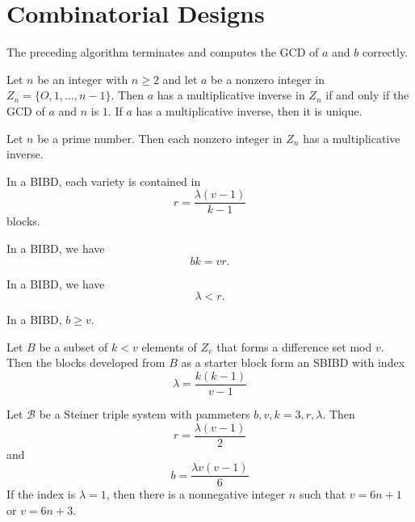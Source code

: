 \chapter{Combinatorial Designs}

\begin{theorem}
  \label{thm:10.1.1}
  The preceding algorithm terminates and computes the GCD of $a$ and $b$ correctly.
\end{theorem}

\begin{theorem}
  \label{thm:10.1.2}
  Let $n$ be an integer with $n \geq 2$ and let $a$ be a nonzero integer in $Z_n = \{O,1 ,\ldots, 
  n - 1\}$. Then $a$ has a multiplicative inverse in $Z_n$ if and only if the GCD of $a$ and $n$ is 
  $1$. If $a$ has a multiplicative inverse, then it is unique.
\end{theorem}

\begin{corollary}
  \label{cor:10.1.3}
  Let $n$ be a prime number. Then each nonzero integer in $Z_n$ has a multiplicative inverse.
\end{corollary}

\begin{theorem}
  \label{thm:10.2.1}
  In a BIBD, each variety is contained in
  \[ r = \frac{\lambda(v-1)}{k-1} \]
  blocks.
\end{theorem}

\begin{corollary}
  \label{cor:10.2.2}
  In a BIBD, we have
  \[ bk=vr. \]
\end{corollary}

\begin{corollary}
  \label{cor:10.2.3}
  In a BIBD, we have
  \[ \lambda < r. \]
\end{corollary}

\begin{theorem}
  \label{thm:10.2.4}
  In a BIBD, $b \geq v.$
\end{theorem}

\begin{theorem}
  \label{thm:10.2.5}
  Let $B$ be a subset of $k < v$ elements of $Z_v$ that forms a difference set mod $v$. Then the 
  blocks developed from $B$ as a starter block form an SBIBD with index
  \[ \lambda = \frac{k(k-1)}{v-1} \]
\end{theorem}

\begin{theorem}
  \label{thm:10.3.1}
  Let $\mathcal{B}$ be a Steiner triple system with pammeters $b, v, k = 3, r, \lambda$. Then
  \begin{equation}\label{10.4}
    r = \frac{\lambda(v-1)}{2}
  \end{equation}
  and 
  \begin{equation}\label{10.5}
    b = \frac{\lambda v(v-1)}{6}
  \end{equation}
  If the index is $\lambda = 1$, then there is a nonnegative integer $n$ such that $v = 6n +1$ or 
  $v = 6n +3$.
\end{theorem}

